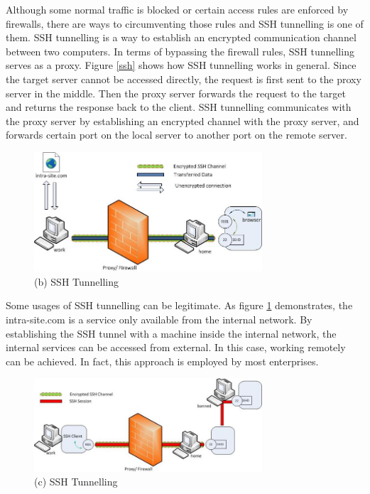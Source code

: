 \documentclass{article}
\begin{document}
Although some normal traffic is blocked or certain access rules are enforced by firewalls, there are ways 
to circumventing those rules and SSH tunnelling is one of them. 
SSH tunnelling is a way to establish an encrypted communication channel between two computers. In terms of 
bypassing the firewall rules, SSH tunnelling serves as a proxy. 
Figure \ref{ssh} shows how SSH tunnelling works in general.
Since the target server cannot be accessed directly, the request is first sent to the proxy 
server in the middle. Then the proxy server forwards the request to the target and returns the response 
back to the client. SSH tunnelling communicates with the proxy server by establishing an encrypted channel with 
the proxy server, and forwards certain port on the local server to another port on the remote server.

\begin{figure}[H]
  \includegraphics[width=8.5cm]{ssh1}
  \caption{(b) SSH Tunnelling\cite{chamith_2012}}
  \label{ssh1}
\end{figure}

Some usages of SSH tunnelling can be legitimate. As figure \ref{ssh1} demonstrates, the intra-site.com is 
a service only available from the internal network. By establishing the SSH tunnel with a machine inside the internal 
network, the internal services can be accessed from external. In this case, working remotely can be achieved. 
In fact, this approach is employed by most enterprises.

\begin{figure}[H]
  \includegraphics[width=8.5cm]{ssh2}
  \caption{(c) SSH Tunnelling \cite{chamith_2012}}
  \label{ssh2}
\end{figure}
\end{document}
